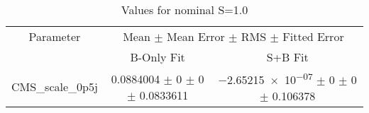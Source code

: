 \begin{table}
\centering
\caption{Values for nominal S=1.0}
\begin{tabular}{ccc}
\toprule
Parameter & \multicolumn{2}{c}{Mean $\pm$ Mean Error $\pm$ RMS $\pm$ Fitted Error}\\
 & B-Only Fit & S+B Fit\\
\midrule
CMS\_scale\_0p5j & \num{0.0884004} $\pm$ \num{0} $\pm$ \num{0} $\pm$ \num{0.0833611} & \num{-2.65215e-07} $\pm$ \num{0} $\pm$ \num{0} $\pm$ \num{0.106378}\\
\bottomrule
\end{tabular}
\end{table}
